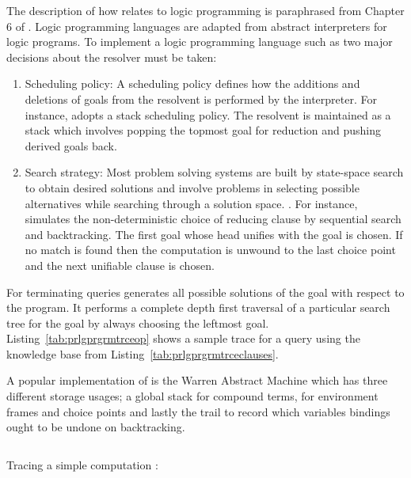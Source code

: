 \documentclass[thesis-solanki.tex]{subfiles}
\begin{document}
The description of how  relates to logic programming is paraphrased from Chapter 6 of
\cite{Sterling:1994:APA:175753}.
Logic programming languages are adapted from abstract interpreters for logic programs.
To implement a logic programming language such as  two major decisions about the resolver must be
taken:
\begin{enumerate}
\item Scheduling policy:
  A scheduling policy defines how the additions and deletions of goals from the resolvent is performed by the interpreter.
  For instance,  adopts a 
  stack scheduling policy. The resolvent is maintained as a stack which involves popping the topmost goal for reduction and pushing derived goals back.

\item Search strategy:
  Most problem solving systems are built by state-space 
  search to obtain desired solutions and involve problems in 
  selecting possible alternatives while searching through a
  solution space. 
  \cite{ohwada1987managing}.
  For instance,  simulates the 
  non-deterministic choice of reducing clause by sequential 
  search and backtracking.
  The first goal whose head unifies with the goal is chosen.
  If no match is found then the computation is unwound to 
  the last choice point and the next unifiable clause is
  chosen.
\end{enumerate}

For terminating queries  generates all possible solutions of the goal with respect to the
 program.
It performs a complete depth first traversal of a particular search tree for the goal by always choosing the
leftmost goal.
Listing~\ref{tab:prlgprgrmtrceop} shows a sample trace for a query using the knowledge base from Listing~\ref{tab:prlgprgrmtrceclauses}.

A popular implementation of  is the Warren Abstract Machine \cite{ait1999warren} which has three
different storage usages; a global stack for compound terms, for environment frames and choice points and lastly
the trail to record which variables bindings ought to be undone on backtracking.

\begin{code-list}[H]
  \begin{singlespace}
    \inputminted[linenos, lastline=6]{prolog}{prologprogramtrace.pl}
  \end{singlespace}
  \caption{Tracing a simple  computation \cite{Sterling:1994:APA:175753} : }
\label{tab:prlgprgrmtrceclauses}
\end{code-list}
\end{document}
